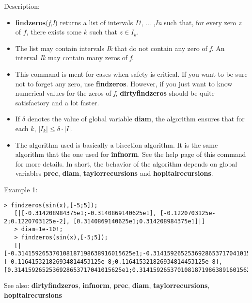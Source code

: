 \noindent Description: \begin{itemize}

\item \textbf{findzeros}(\emph{f},\emph{I}) returns a list of intervals \emph{I1}, ... ,\emph{In} such that, for 
   every zero $z$ of $f$, there exists some $k$ such that $z \in I_k$.

\item The list may contain intervals \emph{Ik} that do not contain any zero of \emph{f}.
   An interval \emph{Ik} may contain many zeros of \emph{f}.

\item This command is ment for cases when safety is critical. If you want to be sure
   not to forget any zero, use \textbf{findzeros}. However, if you just want to know 
   numerical values for the zeros of \emph{f}, \textbf{dirtyfindzeros} should be quite 
   satisfactory and a lot faster.

\item If $\delta$ denotes the value of global variable \textbf{diam}, the algorithm ensures
   that for each $k$, $|I_k| \le \delta \cdot |I|$.

\item The algorithm used is basically a bisection algorithm. It is the same algorithm
   that the one used for \textbf{infnorm}. See the help page of this command for more 
   details. In short, the behavior of the algorithm depends on global variables
   \textbf{prec}, \textbf{diam}, \textbf{taylorrecursions} and \textbf{hopitalrecursions}.
\end{itemize}
\noindent Example 1: 
\begin{center}\begin{minipage}{14.8cm}\begin{Verbatim}[frame=single]
   > findzeros(sin(x),[-5;5]);
   [|[-0.314208984375e1;-0.3140869140625e1], [-0.1220703125e-2;0.1220703125e-2], [0.3140869140625e1;0.314208984375e1]|]
   > diam=1e-10!;
   > findzeros(sin(x),[-5;5]);
   [|[-0.314159265370108187198638916015625e1;-0.3141592652536928653717041015625e1], [-0.116415321826934814453125e-8;0.116415321826934814453125e-8], [0.3141592652536928653717041015625e1;0.314159265370108187198638916015625e1]|]
\end{Verbatim}
\end{minipage}\end{center}
See also: \textbf{dirtyfindzeros}, \textbf{infnorm}, \textbf{prec}, \textbf{diam}, \textbf{taylorrecursions}, \textbf{hopitalrecursions}
